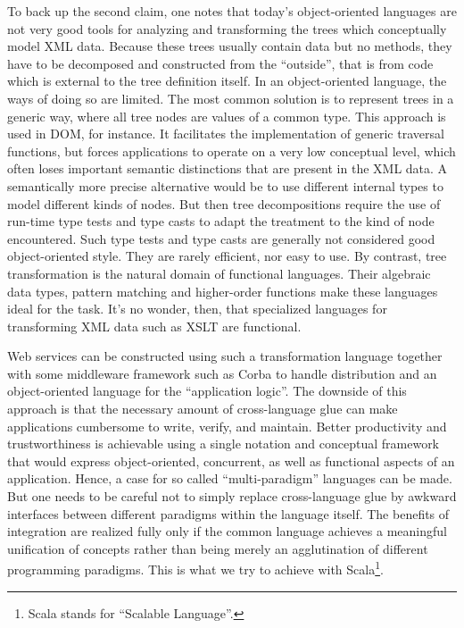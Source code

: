 To back up the second claim, one notes that today's object-oriented languages
are not very good tools for analyzing and transforming the trees which
conceptually model XML data. Because these trees usually contain data but no
methods, they have to be decomposed and constructed from the ``outside'', that is
from code which is external to the tree definition itself. In an
object-oriented language, the ways of doing so are limited. The most common
solution is to represent trees in a generic way, where all tree nodes are
values of a common type.  This approach is used in DOM, for instance. It
facilitates the implementation of generic traversal functions, but forces
applications to operate on a very low conceptual level, which often loses
important semantic distinctions that are present in the XML data. A
semantically more precise alternative would be to use different internal types
to model different kinds of nodes.  But then tree decompositions require the use
of run-time type tests and type casts to adapt the treatment to the kind of
node encountered. Such type tests and type casts are generally not considered
good object-oriented style. They are rarely efficient, nor easy to use.  By
contrast, tree transformation is the natural domain of functional
languages. Their algebraic data types, pattern matching and higher-order
functions make these languages ideal for the task. It's no wonder, then, that
specialized languages for transforming XML data such as XSLT are
functional.

Web services can be constructed using such a transformation language
together with some middleware framework such as Corba to handle
distribution and an object-oriented language for the ``application
logic''.  The downside of this approach is that the necessary amount
of cross-language glue can make applications cumbersome to write,
verify, and maintain.  Better productivity and trustworthiness is
achievable using a single notation and conceptual framework that would
express object-oriented, concurrent, as well as functional aspects of
an application.  Hence, a case for so called ``multi-paradigm''
languages can be made. But one needs to be careful not to simply
replace cross-language glue by awkward interfaces between different
paradigms within the language itself. The benefits of integration are
realized fully only if the common language achieves a meaningful
unification of concepts rather than being merely an agglutination of
different programming paradigms.  This is what we try to achieve with
Scala\footnote{Scala stands for ``Scalable Language''.}.

